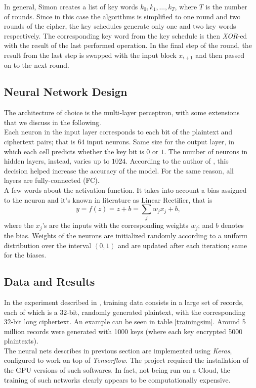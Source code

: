 \documentclass[%
    corpo=11pt,
    twoside,
    stile=classica,
    oldstyle,
    autoretitolo,
    tipotesi=magistrale,
    greek,
    evenboxes,
    english
]{toptesi}
\begin{document}
In general, Simon creates a list of key words $k_0, k_1, \dots, k_T$, where $T$ is the number of rounds. Since in this case the algorithms is simplified to one round and two rounds of the cipher, the key schedules generate only one and two key words respectively. The corresponding key word from the key schedule is then \textit{XOR}-ed with the result of the last performed operation. In the final step of the round, the result from the last step is swapped with the input block $x_{i+1}$ and then passed on to the next round.

\subsection{Neural Network Design}
The architecture of choice is the multi-layer perceptron, with some extensions that we discuss in the following. \\
Each neuron in the input layer corresponds to each bit of the plaintext and ciphertext pairs; that is $64$ input neurons. Same size for the output layer, in which each cell predicts whether the key bit is $0$ or $1$. The number of neurons in hidden layers, instead, varies up to $1024$. According to the author of \cite{jay}, this decision helped increase the accuracy of the model. For the same reason, all layers are fully-connected (FC).\\
A few words about the activation function. It takes into account a bias assigned to the neuron and it's known in literature as Linear Rectifier, that is 
\begin{equation}
y = f(z)= z + b = \sum_j w_jx_j + b,
\end{equation}
where the $x_j$'s are the inputs with the corresponding weights $w_j$; and $b$ denotes the bias. Weights of the neurons are initialized randomly according to a uniform distribution over the interval $(0,1)$ and are updated after each iteration; same for the biases.

\subsection{Data and Results}
In the experiment described in \cite{jay}, training data consists in a large set of records, each of which is a $32$-bit, randomly generated plaintext, with the corresponding $32$-bit long ciphertext. An example can be seen in table \ref{trainingsim}. Around 5 million records were generated with 1000 keys (where each key encrypted 5000 plaintexts). \\
The neural nets describes in previous section are implemented using \textit{Keras}, configured to work on top of \textit{Tensorflow}. The project required the installation of the GPU versions of such softwares. In fact, not being run on a Cloud, the training of such networks clearly appears to be computationally expensive. 
\end{document}
